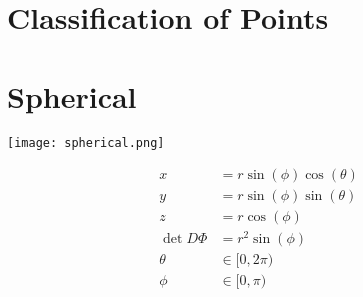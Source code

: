 \documentclass{article}
\theoremstyle{definition}
\begin{document}
\section{Classification of Points}
\section{Spherical}
\begin{center}
	\texttt{[image: spherical.png]}
\end{center}
\begin{align*}
	x&=r\sin(\phi)\cos(\theta)\\
	y&=r\sin(\phi)\sin(\theta)\\
	z&=r\cos(\phi)\\
	\det D\Phi&=r^2\sin(\phi)\\
	\theta&\in[0,2\pi)\\
	\phi&\in[0,\pi)
\end{align*}
\end{document}
